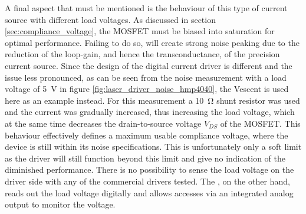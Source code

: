 A final aspect that must be mentioned is the behaviour of this type of current source with different load voltages. As discussed in section \ref{sec:compliance_voltage}, the MOSFET must be biased into saturation for optimal performance. Failing to do so, will create strong noise peaking due to the reduction of the loop-gain, and hence the transconductance, of the precision current source. Since the design of the digital current driver is different and the issue less pronounced, as can be seen from the noise measurement with a load voltage of \qty{5}{\V} in figure \ref{fig:laser_driver_noise_hmp4040}, the Vescent  is used here as an example instead. For this measurement a \qty{10}{\ohm} shunt resistor was used and the current was gradually increased, thus increasing the load voltage, which at the same time decreases the drain-to-source voltage $V_{DS}$ of the MOSFET. This behaviour effectively defines a maximum  usable compliance voltage, where the device is still within its noise specifications. This is unfortunately only a soft limit as the driver will still function beyond this limit and give no indication of the diminished performance. There is no possibility to sense the load voltage on the driver side with any of the commercial drivers tested. The , on the other hand, reads out  the load voltage digitally and allows accesses via an integrated analog output to monitor the voltage.


